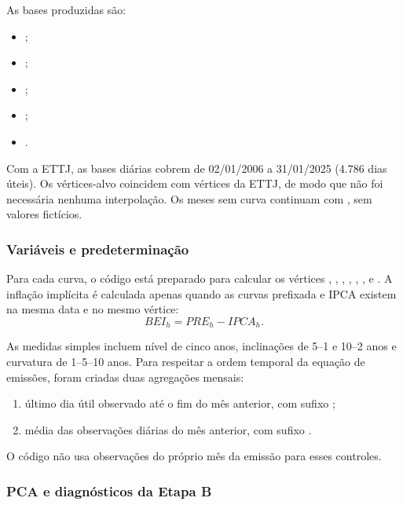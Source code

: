 \documentclass[12pt,a4paper]{article}
\begin{document}
As bases produzidas são:
\begin{itemize}[leftmargin=1.2cm]
    \item {};
    \item {};
    \item {};
    \item {};
    \item {}.
\end{itemize}

Com a ETTJ, as bases diárias cobrem de 02/01/2006 a 31/01/2025 (4.786 dias úteis).
Os vértices-alvo coincidem com vértices da ETTJ, de modo que não foi necessária
nenhuma interpolação. Os meses sem curva continuam com , sem valores
fictícios.

\subsubsection{Variáveis e predeterminação}

Para cada curva, o código está preparado para calcular os vértices
, , , , , ,  e
. A inflação implícita é calculada apenas quando as curvas prefixada e
IPCA existem na mesma data e no mesmo vértice:
\[
    BEI_h = PRE_h - IPCA_h.
\]

As medidas simples incluem nível de cinco anos, inclinações de 5--1 e 10--2 anos
e curvatura de 1--5--10 anos. Para respeitar a ordem temporal da equação de
emissões, foram criadas duas agregações mensais:

\begin{enumerate}[leftmargin=1.2cm]
    \item último dia útil observado até o fim do mês anterior, com sufixo
    ;
    \item média das observações diárias do mês anterior, com sufixo
    .
\end{enumerate}

O código não usa observações do próprio mês da emissão para esses controles.

\subsubsection{PCA e diagnósticos da Etapa B}
\end{document}
